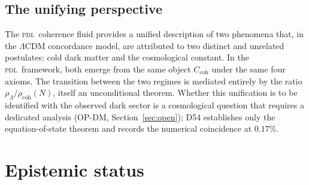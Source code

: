 \documentclass[12pt,a4paper]{article}
\newcommand{\PDL}{\textsc{pdl}}
\newcommand{\Ccoh}{C_{\mathrm{coh}}}
\newcommand{\rhocoh}{\rho_{\mathrm{coh}}}
\newcommand{\rhoLambda}{\rho_\Lambda}
\begin{document}
\subsection{The unifying perspective}

The \PDL\ coherence fluid provides a unified description of two phenomena that, in the $\Lambda$CDM concordance model, are attributed to two distinct and unrelated postulates: cold dark matter and the cosmological constant. In the \PDL\ framework, both emerge from the same object $\Ccoh$ under the same four axioms. The transition between the two regimes is mediated entirely by the ratio $\rhoLambda/\rhocoh(N)$, itself an unconditional theorem. Whether this unification is to be identified with the observed dark sector is a cosmological question that requires a dedicated analysis (OP-DM, Section~\ref{sec:open}); D54 establishes only the equation-of-state theorem and records the numerical coincidence at $0.17\%$.

\section{Epistemic status}
\label{sec:epistemic}
\end{document}
